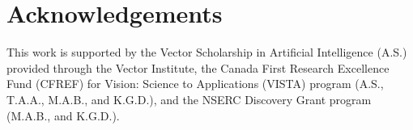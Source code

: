 \section*{Acknowledgements}

This work 
is supported by
the Vector Scholarship in Artificial Intelligence (A.S.) provided through the Vector Institute,
the Canada First Research Excellence Fund (CFREF) for Vision: Science to Applications (VISTA) program (A.S., T.A.A., M.A.B., and K.G.D.),
and the NSERC Discovery Grant program (M.A.B., and K.G.D.).
